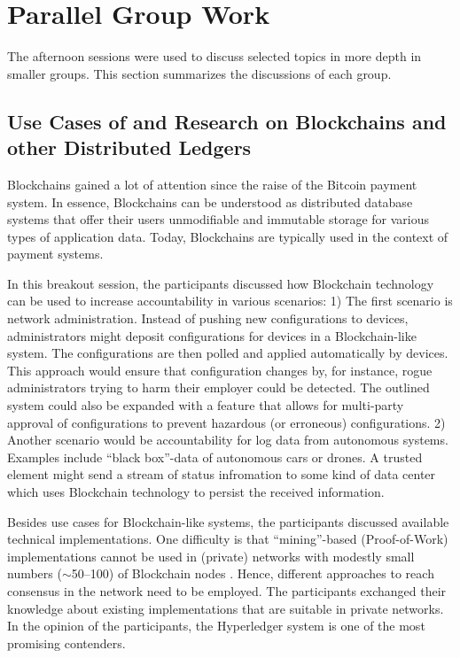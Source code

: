 \section{Parallel Group Work}\label{sec:parallel-group-work}

The afternoon sessions were used to discuss selected topics in more depth in
smaller groups. This section summarizes the discussions of each group.


\subsection{Use Cases of and Research on Blockchains and other Distributed
Ledgers}

Blockchains gained a lot of attention since the raise of the Bitcoin
\cite{bitcoin} payment system. In essence, Blockchains can be understood as
distributed database systems that offer their users unmodifiable and immutable
storage for various types of application data. Today, Blockchains are typically
used in the context of payment systems.

In this breakout session, the participants discussed how Blockchain technology
can be used to increase accountability in various scenarios: 1) The first
scenario is network administration. Instead of pushing new configurations to
devices, administrators might deposit configurations for devices in a
Blockchain-like system. The configurations are then polled and applied
automatically by devices. This approach would ensure that configuration changes
by, for instance, rogue administrators trying to harm their employer could be
detected. The outlined system could also be expanded with a feature that allows
for multi-party approval of configurations to prevent hazardous (or erroneous)
configurations. 2) Another scenario would be accountability for log data from
autonomous systems. Examples include ``black box''-data of autonomous cars or
drones. A trusted element might send a stream of status infromation to some kind
of data center which uses Blockchain technology to persist the received
information.

Besides use cases for Blockchain-like systems, the participants discussed
available technical implementations. One difficulty is that ``mining''-based
(Proof-of-Work) \cite{hashcash} implementations cannot be used in (private)
networks with modestly small numbers ($\sim$50--100) of Blockchain nodes
\cite{dangerPBC}. Hence, different approaches to reach consensus in the network
need to be employed. The participants exchanged their knowledge about existing
implementations that are suitable in private networks. In the opinion of the
participants, the Hyperledger system \cite{hyperledger} is one of the most
promising contenders.

